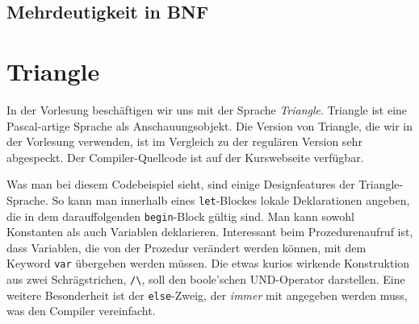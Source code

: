 \documentclass[
  ngerman,
  DIV=12
]{scrartcl}
\begin{document}

\subsection{Mehrdeutigkeit in BNF}



\section{Triangle}

In der Vorlesung beschäftigen wir uns mit der Sprache \emph{Triangle}. Triangle ist eine Pascal-artige Sprache als Anschauungsobjekt. Die Version von Triangle, die wir in der Vorlesung verwenden, ist im Vergleich zu der regulären Version sehr abgespeckt. Der Compiler-Quellcode ist auf der Kurswebseite verfügbar. 


\begin{figure}[!h]
\end{figure}

Was man bei diesem Codebeispiel sieht, sind einige Designfeatures der Triangle-Sprache. So kann man innerhalb eines \verb|let|-Blockes lokale Deklarationen angeben, die in dem darauffolgenden \verb|begin|-Block gültig sind. Man kann sowohl Konstanten als auch Variablen deklarieren. Interessant beim Prozedurenaufruf ist, dass Variablen, die von der Prozedur verändert werden können, mit dem Keyword \verb|var| übergeben werden müssen. Die etwas kurios wirkende Konstruktion aus zwei Schrägstrichen, \verb|/\|, soll den boole'schen UND-Operator darstellen. Eine weitere Besonderheit ist der \verb|else|-Zweig, der \emph{immer} mit angegeben werden muss, was den Compiler vereinfacht.
\end{document}
